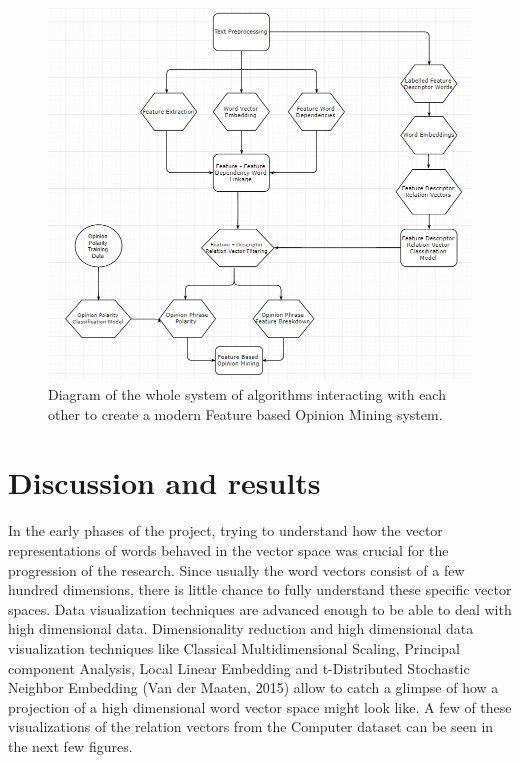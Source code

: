 \documentclass{sig-alternate}
\begin{document}
\begin{figure}
\centering
\includegraphics[scale=0.50]{images/full_technique.JPG}
\caption{Diagram of the whole system of algorithms interacting with each other to create a modern Feature based Opinion Mining system.}
\end{figure}

\section{Discussion and results}
In the early phases of the project, trying to understand how the vector representations of words behaved in the vector space was crucial for the progression of the research. Since usually the word vectors consist of a few hundred dimensions, there is little chance to fully understand these specific vector spaces. Data visualization techniques are advanced enough to be able to deal with high dimensional data. Dimensionality reduction and high dimensional data visualization techniques like Classical Multidimensional Scaling, Principal component Analysis, Local Linear Embedding and t-Distributed Stochastic Neighbor Embedding (Van der Maaten, 2015) allow to catch a glimpse of how a projection of a high dimensional word vector space might look like. A few of these visualizations of the relation vectors from the Computer dataset can be seen in the next few figures.
\end{document}
